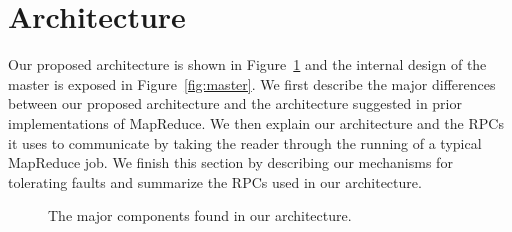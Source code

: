 \documentclass[10pt,letter,final,article,twocolumn]{article} %
\begin{document}

\section{Architecture}
\label{sec:arch}

Our proposed architecture is shown in Figure~\ref{fig:arch} and the internal design of the master is exposed in Figure~\ref{fig:master}. We first describe the major differences between our proposed architecture and the architecture suggested in prior implementations of MapReduce. We then explain our architecture and the RPCs it uses to communicate by taking the reader through the running of a typical MapReduce job. We finish this section by describing our mechanisms for tolerating faults and summarize the RPCs used in our architecture.

\begin{figure}[htbp]
\begin{center}
\caption{The major components found in our architecture.}
\label{fig:arch}
\end{center}
\end{figure}
\end{document}
